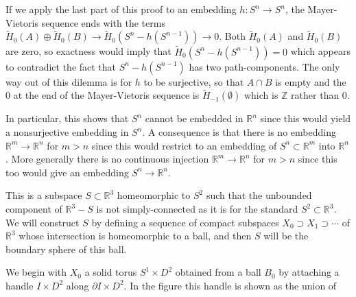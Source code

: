 If we apply the last part of this proof to an embedding $h:S^n \to S^n$, the Mayer-Vietoris sequence ends with the terms $\tilde{H}_0(A) \oplus \tilde{H}_0(B) \to \tilde{H}_0(S^n - h(S^{n-1})) \to 0$. Both
$\tilde{H}_0(A)$ and $\tilde{H}_0(B)$ are zero, so exactness would imply that $\tilde{H}_0(S^n - h(S^{n-1})) = 0$
which appears to contradict the fact that $S^n - h(S^{n-1})$ has two path-components.
The only way out of this dilemma is for $h$ to be surjective, so that $A \cap B$ is empty and
the $0$ at the end of the Mayer-Vietoris sequence is $\tilde{H}_{-1}(\emptyset)$ which is $\mathbb{Z}$ rather than $0$.

In particular, this shows that $S^n$ cannot be embedded in $\mathbb{R}^n$ since this would
yield a nonsurjective embedding in $S^n$. A consequence is that there is no embedding
$\mathbb{R}^m \to \mathbb{R}^n$ for $m > n$ since this would restrict to an embedding of $S^n \subset \mathbb{R}^m$ into $\mathbb{R}^n$.
More generally there is no continuous injection $\mathbb{R}^m \to \mathbb{R}^n$ for $m > n$ since this too
would give an embedding $S^n \to \mathbb{R}^n$.

\begin{example}
\label{ex:alexander-horned-sphere}
This is a subspace $S \subset \mathbb{R}^3$ homeomorphic to $S^2$ such that the unbounded component of $\mathbb{R}^3 - S$ is not simply-connected
as it is for the standard $S^2 \subset \mathbb{R}^3$. We will construct $S$ by defining a sequence of compact subspaces $X_0 \supset X_1 \supset \cdots$ of $\mathbb{R}^3$ whose intersection is homeomorphic to a ball,
and then $S$ will be the boundary sphere of this ball.
\end{example}

We begin with $X_0$ a solid torus $S^1 \times D^2$ obtained from a ball $B_0$ by attaching
a handle $I \times D^2$ along $\partial I \times D^2$. In the figure this handle is shown as the union of

